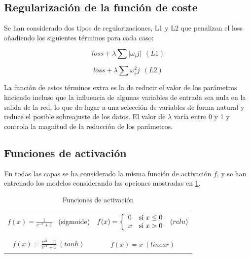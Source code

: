



\subsection{Regularización de la función de coste}
Se han considerado dos tipos de regularizaciones, L1 y L2 que penalizan el loss añadiendo
los siguientes términos para cada caso:

\begin{equation}
    loss + \lambda \sum |\omega_ij| ~~(L1)
\end{equation}

\begin{equation}
    loss + \lambda \sum \omega^2_ij ~~(L2)
\end{equation}

La función de estos términos extra es la de reducir el valor de los parámetros haciendo incluso que la influencia de 
algunas variables de entrada sea nula en la salida de la red, lo que da lugar a una selección de variables de forma natural y
reduce el posible sobreajuste de los datos. El valor de $\lambda$ varía entre 0 y 1 y controla la magnitud
de la reducción de los parámetros. 


\subsection{Funciones de activación}
En todas las capas se ha considerado la misma función de activación $f$, y se han entrenado los modelos considerando 
las opciones mostradas en \ref{activation}.

\begin{table}[h!]
    \centering
    \begin{tabular}{|c|c|}   
        \hline
        &\\
     $ f(x)= \frac{1}{e^{-x}+1}$ ~(sigmoide) & 
     $f(x) = \left\lbrace
     \begin{array}{ll}
     0 &\textup{si } x\leq 0 \\
     x & \textup{si } x > 0 
     \end{array}
     \right. ~(relu)$    \\
     &\\
     \hline
     &\\
     $f(x)= \frac{e^{2x}-1}{e^{2x}+1} ~(tanh)$ & $f(x)=x ~ (linear)$    \\ 
     &\\
     \hline
    \end{tabular}
    \caption{ Funciones de activación}
    \label{activation}
    \end{table}


